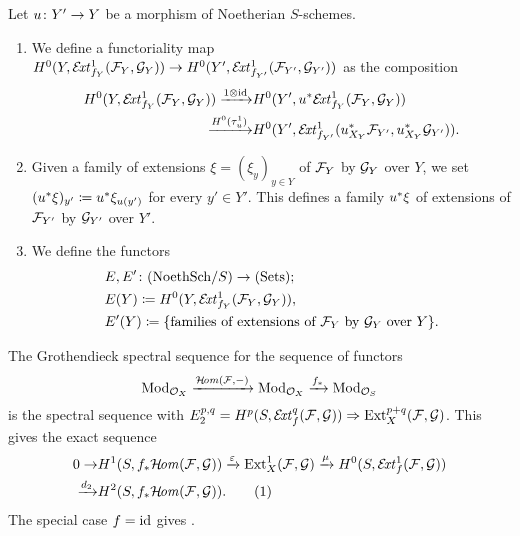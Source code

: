 \begin{definition} 
	Let $u\colon Y'\to Y$ be a morphism of Noetherian $S$-schemes.

	\begin{enumerate}\item We define a functoriality map
	$H^0(Y,\mathcal{E}\!\mathit{xt}^1_{f_Y}(\mathcal{F}_Y,\mathcal{G}_Y))
	\to
	H^0(Y',\mathcal{E}\!\mathit{xt}^1_{f_{Y'}}(\mathcal{F}_{Y'},\mathcal{G}_{Y'}))
	$
	as the composition
	\begin{align*}
		H^0(Y,\mathcal{E}\!\mathit{xt}^1_{f_Y}(\mathcal{F}_Y,\mathcal{G}_Y))
		\xrightarrow{1\otimes \operatorname{id}} & 
		H^0(Y',u^{*}\mathcal{E}\!\mathit{xt}^1_{f_Y}(\mathcal{F}_Y,\mathcal{G}_Y)) \\
		\xrightarrow{H^0(\tau^1_u)} &
		H^0(Y',\mathcal{E}\!\mathit{xt}^1_{f_{Y'}}(u_{X_Y}^{*}\mathcal{F}_{Y'},u_{X_Y}^{*}\mathcal{G}_{Y'})).
	\end{align*}

	\item Given a family of extensions $\xi = (\xi_y)_{y\in Y}$ of $\mathcal{F}_Y$ by $\mathcal{G}_Y$ over $Y$, we set $(u^{*}\xi)_{y'} \coloneqq u^{*}\xi_{u(y')}$ for every $y' \in Y'$. This defines a family $u^{*}\xi$ of extensions of $\mathcal{F}_{Y'}$ by $\mathcal{G}_{Y'}$ over $Y'$.

	\item We define the functors
	\begin{align*}
		& E,E' \colon (\textup{NoethSch}/S) \to (\textup{Sets}); \\
		& E(Y) \coloneqq H^0(Y,\mathcal{E}\!\mathit{xt}^1_{f_Y}(\mathcal{F}_Y,\mathcal{G}_Y)), \\
		& E'(Y) \coloneqq \{\text{families of extensions of $\mathcal{F}_Y$ by $\mathcal{G}_Y$ over } Y\}.
	\end{align*}
\end{enumerate}
\end{definition}
\begin{remark}
	The Grothendieck spectral sequence for the sequence of functors
	\[\mathrm{Mod}_{\mathcal{O}_X}\xrightarrow{\mathcal{H}\!\mathit{om}(\mathcal{F},-)} \mathrm{Mod}_{\mathcal{O}_X}\xrightarrow{f_{*}} \mathrm{Mod}_{\mathcal{O}_S}\]
	is the spectral sequence with $E_2^{p,q}=H^p(S,\mathcal{E}\!\mathit{xt}^q_f(\mathcal{F},\mathcal{G})) \Rightarrow \operatorname{Ext}^{p+q}_X(\mathcal{F},\mathcal{G})$. This gives the exact sequence
	\begin{align*}
		0
		 \to & H^1(S,\pushf{f}\HOM(\mc{F},\mc{G}))
		 \xto{\varepsilon} \Ext^1_X(\mc{F},\mc{G})
		 \xto{\mu} H^0(S,\EXT^1_f(\mc{F},\mc{G})) \\
		 \xto{d_2} & H^2(S,\pushf{f}\HOM(\mc{F},\mc{G})). \label{es-rel-ext} \addtocounter{equation}{1}\tag{\theequation}
	\end{align*}
	The special case $f=\operatorname{id}$ gives .
\end{remark}

